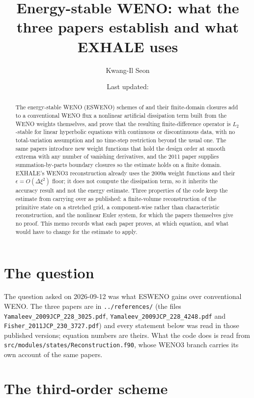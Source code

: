 \documentclass[english,a4paper]{my_memo}
\title{Energy-stable WENO: what the three papers establish and what EXHALE uses}
\author{Kwang-Il Seon}
\date{Last updated: \docmoddate}
\begin{document}
\maketitle

\begin{abstract}
The energy-stable WENO (ESWENO) schemes of \citet{Yamaleev2009a,Yamaleev2009b}
and their finite-domain closures \citep{Fisher2011} add to a conventional WENO
flux a nonlinear artificial dissipation term built from the WENO weights
themselves, and prove that the resulting finite-difference operator is
$L_2$-stable for linear hyperbolic equations with continuous or discontinuous
data, with no total-variation assumption and no time-step restriction beyond
the usual one. The same papers introduce new weight functions that hold the
design order at smooth extrema with any number of vanishing derivatives, and
the 2011 paper supplies summation-by-parts boundary closures so the estimate
holds on a finite domain. EXHALE's WENO3 reconstruction already uses the
2009a weight functions and their $\epsilon=O(\Delta\xi^2)$ floor; it does not
compute the dissipation term, so it inherits the accuracy result and not the
energy estimate. Three properties of the code keep the estimate from carrying
over as published: a finite-volume reconstruction of the primitive state on a
stretched grid, a component-wise rather than characteristic reconstruction,
and the nonlinear Euler system, for which the papers themselves give no
proof. This memo records what each paper proves, at which equation, and what
would have to change for the estimate to apply.
\end{abstract}

\section{The question}

The question asked on 2026-09-12 was what ESWENO gains over conventional
WENO. The three papers are in \texttt{../references/} (the files
\texttt{Yamaleev\_2009JCP\_228\_3025.pdf}, \texttt{Yamaleev\_2009JCP\_228\_4248.pdf}
and \texttt{Fisher\_2011JCP\_230\_3727.pdf}) and every statement below was read
in those published versions; equation numbers are theirs. What the code does
is read from \texttt{src/modules/states/Reconstruction.f90}, whose WENO3
branch carries its own account of the same papers.

\section{The third-order scheme \citep{Yamaleev2009a}}
\end{document}
